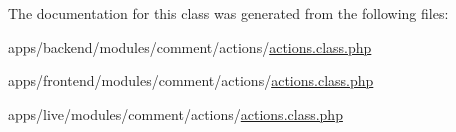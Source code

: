 The documentation for this class was generated from the following files\-:\begin{DoxyCompactItemize}
\item 
apps/backend/modules/comment/actions/\hyperlink{backend_2modules_2comment_2actions_2actions_8class_8php}{actions.\-class.\-php}\item 
apps/frontend/modules/comment/actions/\hyperlink{frontend_2modules_2comment_2actions_2actions_8class_8php}{actions.\-class.\-php}\item 
apps/live/modules/comment/actions/\hyperlink{live_2modules_2comment_2actions_2actions_8class_8php}{actions.\-class.\-php}\end{DoxyCompactItemize}
